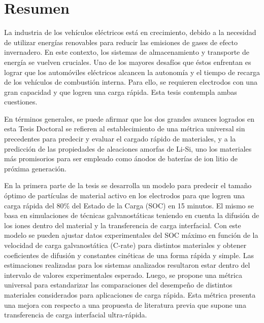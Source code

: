 \chapter{Resumen}

La industria de los vehículos eléctricos está en crecimiento, debido a la 
necesidad de utilizar energías renovables para reducir las emisiones de gases de 
efecto invernadero. En este contexto, los sistemas de almacenamiento y transporte 
de energía se vuelven cruciales. Uno de los mayores desafíos que éstos enfrentan es lograr que 
los automóviles eléctricos alcancen la autonomía y el tiempo de recarga de los 
vehículos de combustión interna. Para ello, se requieren electrodos con una 
gran capacidad y que logren una carga rápida. Esta tesis contempla ambas 
cuestiones.

En términos generales, se puede afirmar que los dos grandes avances logrados en 
esta Tesis Doctoral se refieren al establecimiento de una métrica universal sin 
precedentes para predecir y evaluar el cargado rápido de materiales, y a la 
predicción de las propiedades de aleaciones amorfas de Li-Si, uno los materiales
más promisorios para ser empleado como ánodos de baterías de ion litio de próxima 
generación.

En la primera parte de la tesis se desarrolla un modelo para predecir 
el tamaño óptimo de partículas de material activo en los electrodos para que 
logren una carga rápida del 80\% del Estado de la Carga (SOC) en 15 minutos. El 
mismo se basa en simulaciones de técnicas galvanostáticas teniendo en cuenta la 
difusión de los iones dentro del material y la transferencia de carga interfacial. 
Con este modelo se pueden ajustar datos experimentales del SOC máximo en función 
de la velocidad de carga galvanostática (C-rate) para distintos materiales y obtener coeficientes de difusión y 
constantes cinéticas de una forma rápida y simple. Las estimaciones realizadas 
para los sistemas analizados resultaron estar dentro del intervalo de valores 
experimentales esperado. Luego, se propone una métrica universal para 
estandarizar las comparaciones del desempeño de distintos materiales considerados 
para aplicaciones de carga rápida. Esta métrica presenta una mejora con respecto 
a una propuesta de literatura previa que supone una transferencia de carga 
interfacial ultra-rápida.

